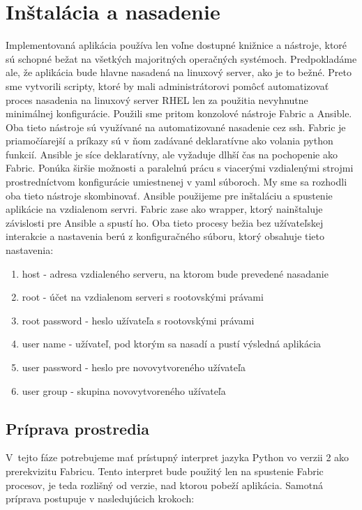 \chapter{Inštalácia a nasadenie}
Implementovaná aplikácia používa len voľne dostupné knižnice a nástroje, ktoré sú schopné bežat na všetkých majoritných operačných systémoch. Predpokladáme ale, že aplikácia bude hlavne nasadená na linuxový server, ako je to bežné. Preto sme vytvorili scripty, ktoré by mali administrátorovi pomôcť automatizovať proces nasadenia na linuxový server RHEL len za použitia nevyhnutne minimálnej konfigurácie. Použili sme pritom konzolové nástroje Fabric a Ansible. Oba tieto nástroje sú využívané na automatizované nasadenie cez ssh. Fabric je priamočíarejší a príkazy sú v ňom zadávané deklaratívne ako volania python funkcií. Ansible je síce deklaratívny, ale vyžaduje dlhší čas na pochopenie ako Fabric. Ponúka širšie možnosti a paralelnú prácu s viacerými vzdialenými strojmi prostredníctvom konfigurácie umiestnenej v yaml súboroch.  My sme sa rozhodli oba tieto nástroje skombinovať. Ansible použijeme pre inštaláciu a spustenie aplikácie na vzdialenom servri. Fabric zase ako wrapper, ktorý nainštaluje závislosti pre Ansible a spustí ho. Oba tieto procesy bežia bez užívateľskej interakcie a nastavenia berú z konfiguračného súboru, ktorý obsahuje tieto nastavenia:

\begin{enumerate}
  \item host - adresa vzdialeného serveru, na ktorom bude prevedené nasadanie
  \item root - účet na vzdialenom serveri s rootovskými právami
  \item root \textunderscore password - heslo užívateľa s rootovskými právami
  \item  user \textunderscore name - užívateľ, pod ktorým sa nasadí a pustí výsledná aplikácia
  \item  user \textunderscore password - heslo pre novovytvoreného užívateľa
  \item user \textunderscore group - skupina novovytvoreného užívateľa
\end{enumerate}


\section{Príprava prostredia}
V~tejto fáze potrebujeme mať prístupný interpret jazyka Python vo verzii 2 ako prerekvizitu Fabricu. Tento interpret bude použitý len na spustenie Fabric procesov, je teda rozlišný od verzie, nad ktorou pobeží aplikácia. Samotná príprava postupuje v nasledujúcich krokoch:

